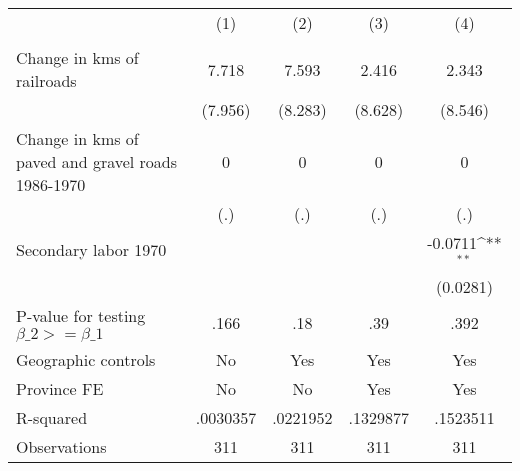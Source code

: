 {
\def\sym#1{\ifmmode^{#1}\else\(^{#1}\)\fi}
\begin{tabular}{l*{4}{c}}
\hline\hline
                &\multicolumn{1}{c}{(1)}&\multicolumn{1}{c}{(2)}&\multicolumn{1}{c}{(3)}&\multicolumn{1}{c}{(4)}\\
                &\multicolumn{1}{c}{}&\multicolumn{1}{c}{}&\multicolumn{1}{c}{}&\multicolumn{1}{c}{}\\
\hline
Change in kms of railroads&    7.718         &    7.593         &    2.416         &    2.343         \\
                &  (7.956)         &  (8.283)         &  (8.628)         &  (8.546)         \\
[1em]
Change in kms of paved and gravel roads 1986-1970&        0         &        0         &        0         &        0         \\
                &      (.)         &      (.)         &      (.)         &      (.)         \\
[1em]
Secondary labor 1970&                  &                  &                  &  -0.0711\sym{**} \\
                &                  &                  &                  & (0.0281)         \\
\hline
P-value for testing $\beta\_{2} >= \beta\_{1}$&     .166         &      .18         &      .39         &     .392         \\
Geographic controls&       No         &      Yes         &      Yes         &      Yes         \\
Province FE     &       No         &       No         &      Yes         &      Yes         \\
R-squared       & .0030357         & .0221952         & .1329877         & .1523511         \\
Observations    &      311         &      311         &      311         &      311         \\
\hline\hline
\end{tabular}
}
